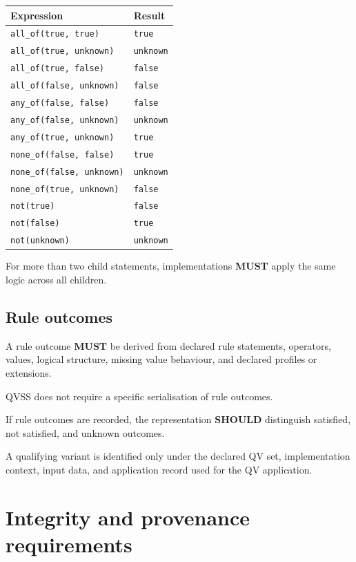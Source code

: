 \documentclass[11pt,a4paper]{article}
\begin{document}
\begin{center}
\begin{tabular}{ll}
\toprule
\textbf{Expression} & \textbf{Result} \\
\midrule
\texttt{all\_of(true, true)} & \texttt{true} \\
\texttt{all\_of(true, unknown)} & \texttt{unknown} \\
\texttt{all\_of(true, false)} & \texttt{false} \\
\texttt{all\_of(false, unknown)} & \texttt{false} \\
\texttt{any\_of(false, false)} & \texttt{false} \\
\texttt{any\_of(false, unknown)} & \texttt{unknown} \\
\texttt{any\_of(true, unknown)} & \texttt{true} \\
\texttt{none\_of(false, false)} & \texttt{true} \\
\texttt{none\_of(false, unknown)} & \texttt{unknown} \\
\texttt{none\_of(true, unknown)} & \texttt{false} \\
\texttt{not(true)} & \texttt{false} \\
\texttt{not(false)} & \texttt{true} \\
\texttt{not(unknown)} & \texttt{unknown} \\
\bottomrule
\end{tabular}
\end{center}

For more than two child statements, implementations \textbf{MUST} apply the same logic across all children.

\subsection{Rule outcomes}

A rule outcome \textbf{MUST} be derived from declared rule statements, operators, values, logical structure, missing value behaviour, and declared profiles or extensions.

QVSS does not require a specific serialisation of rule outcomes.

If rule outcomes are recorded, the representation \textbf{SHOULD} distinguish satisfied, not satisfied, and unknown outcomes.

A qualifying variant is identified only under the declared QV set, implementation context, input data, and application record used for the QV application.

\section{Integrity and provenance requirements}
\end{document}
